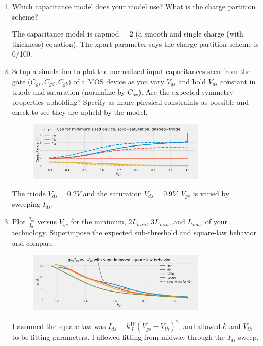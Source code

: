 \begin{enumerate}
\item {\color{blue}Which capacitance model does your model use? What is the charge partition scheme?}

    The capacitance model is capmod = 2 (a smooth and single charge (with thickness) equation). The xpart parameter says the charge partition scheme is 0/100.

\item {\color{blue}Setup a simulation to plot the normalized input capacitances seen from the gate ($C_{gs}, C_{gd}, C_{gb}$) of a MOS device as you vary $V_{gs}$ and hold $V_{ds}$ constant in triode and saturation (normalize by $C_{ox}$). Are the expected symmetry properties upholding? Specify as many physical constraints as possible and check to see they are upheld by the model.}

    \begin{figure}[H]
        \centering
        \includegraphics[width=0.8\textwidth]{figs/problem7.png}
    \end{figure}

    The triode $V_{ds} = 0.2 V$ and the saturation $V_{ds} = 0.9 V$. $V_{gs}$ is varied by sweeping $I_{ds}$.

\item {\color{blue}Plot $\frac{g_m}{I_d}$ versus $V_{gs}$ for the minimum, $2 L_{min}$, $3 L_{min}$, and $L_{max}$ of your technology. Superimpose the expected sub-threshold and square-law behavior and compare.}

    \begin{figure}[H]
        \centering
        \includegraphics[width=0.8\textwidth]{figs/problem8.png}
    \end{figure}

    I assumed the square law was $I_{ds} = k \frac{W}{L} (V_{gs} - V_{th})^2$, and allowed $k$ and $V_{th}$ to be fitting parameters. I allowed fitting from midway through the $I_{ds}$ sweep.


\end{enumerate}
